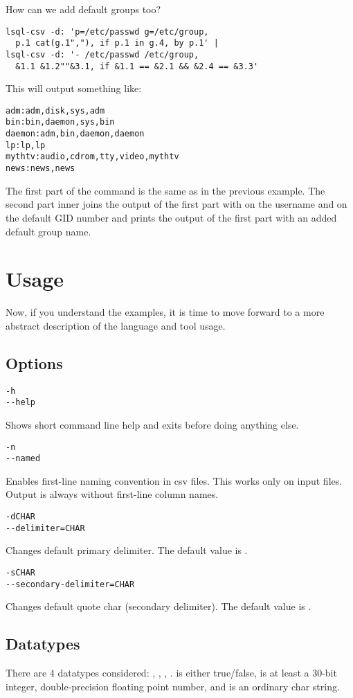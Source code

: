 How can we add default groups too?
\begin{verbatim}
lsql-csv -d: 'p=/etc/passwd g=/etc/group, 
  p.1 cat(g.1","), if p.1 in g.4, by p.1' |
lsql-csv -d: '- /etc/passwd /etc/group, 
  &1.1 &1.2""&3.1, if &1.1 == &2.1 && &2.4 == &3.3'
\end{verbatim}
This will output something like:
\begin{verbatim}
adm:adm,disk,sys,adm
bin:bin,daemon,sys,bin
daemon:adm,bin,daemon,daemon
lp:lp,lp
mythtv:audio,cdrom,tty,video,mythtv
news:news,news
\end{verbatim}

The first part of the command is the same as in the previous example. The second part inner joins the output
of the first part with  on the username and  on the default GID number and prints
the output of the first part with an added default group name.



\section{Usage}
Now, if you understand the examples, it is time to move forward to a more abstract description of the language and tool usage.

\subsection{Options}
\begin{verbatim}
-h
--help
\end{verbatim}
Shows short command line help and exits before doing anything else.

\begin{verbatim}
-n
--named
\end{verbatim}
Enables first-line naming convention in csv files. This works only on input files. 
Output is always without first-line column names.

\begin{verbatim}
-dCHAR
--delimiter=CHAR
\end{verbatim}
Changes default primary delimiter. The default value is \icode{,}.

\begin{verbatim}
-sCHAR
--secondary-delimiter=CHAR
\end{verbatim}
Changes default quote char (secondary delimiter). The default value is .

\subsection{Datatypes}
There are 4 datatypes considered: , , , . 
 is either true/false,  is at least a 30-bit integer,  double-precision floating point number, and  is an ordinary char string.

